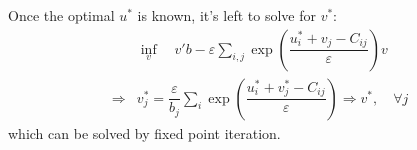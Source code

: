 \documentclass[11pt,a4paper]{ctexart}
\numberwithin{equation}{section}%
\begin{document}
Once the optimal $ u^* $ is known, it's left to solve for $ v^* $:
\begin{align*}
     &\mathop{ \inf }\limits_{v}\quad  v'b  - \varepsilon \sum_{i,j}\exp\left( \dfrac{   u_i^* + v_j -C_{ij}}{ \varepsilon }   \right)v \\
      \Rightarrow& v_j^* = \dfrac{ \varepsilon  }{ b_j } \sum_{i}\exp\left( \dfrac{   u_i^* + v_j^* -C_{ij}}{ \varepsilon }   \right)  \Rightarrow v^* ,\quad \forall j
\end{align*}
which can be solved by fixed point iteration.






































    
\end{document}
